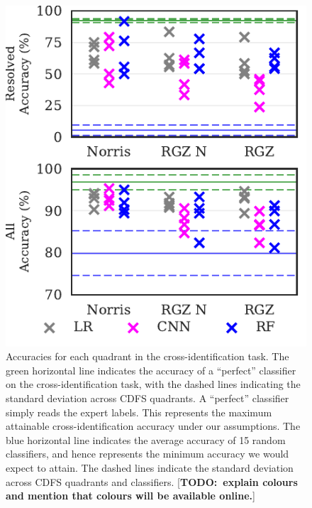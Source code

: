 \documentclass[fleqn,usenatbib,usedcolumn]{mnras}
\newcommand{\todo}[1]{ {\color{red}[{\bf TODO:~{#1}}]} }
\begin{document}
  \begin{figure}
  \centering
  \includegraphics[width=\columnwidth]{images/cdfs_cross_identification_grid.pdf}
  \caption{Accuracies for each quadrant in the cross-identification
    task. The green horizontal line indicates the accuracy of a ``perfect''
    classifier on the cross-identification task, with the dashed lines
    indicating the standard deviation across CDFS quadrants. A ``perfect''
    classifier simply reads the expert labels. This represents the maximum
    attainable cross-identification accuracy under our assumptions. The blue
    horizontal line indicates the average accuracy of 15 random classifiers, and
    hence represents the minimum accuracy we would expect to attain. The dashed
    lines indicate the standard deviation across CDFS quadrants and classifiers.
    \todo{explain colours and mention that colours will be available online.}
    \label{fig:cross-id-accuracy}}
  \end{figure}
\end{document}
